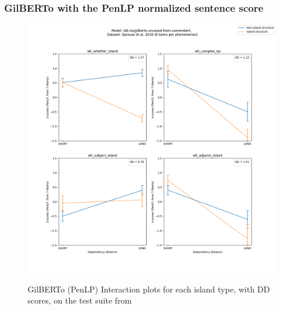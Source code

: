 \subsubsection{GilBERTo with the PenLP normalized sentence score}
\begin{figure}[h]
	\centering
	\includegraphics[width=1\textwidth]{images/AppendixA/Sprouse_wh_idb-ita_gilberto-uncased-from-camembert_PenLP-zscores-likert-2022-09-16_h10m00s24.png} 
	\label{A-fig:sprouse_gilberto_penlp}
	\caption{GilBERTo (PenLP) Interaction plots for each island type, with DD scores, on the test suite from \citet{sprouse2016experimental}}
\end{figure}
\clearpage
